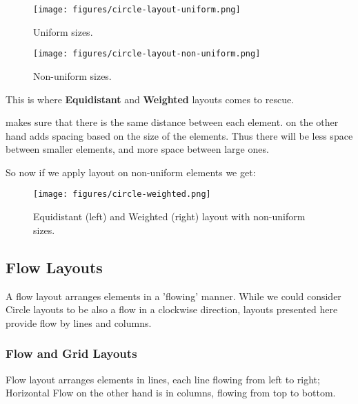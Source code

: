\documentclass[a4paper,10pt,twoside]{book}
\begin{document}
\begin{figure}

\begin{center}
\texttt{[image: figures/circle-layout-uniform.png]}\caption{Uniform sizes.\label{circle-layout-uniform}}\end{center}
\end{figure}



\begin{figure}

\begin{center}
\texttt{[image: figures/circle-layout-non-uniform.png]}\caption{Non-uniform sizes.\label{circle-layout-non-uniform}}\end{center}
\end{figure}


This is where \textbf{Equidistant} and \textbf{Weighted} layouts comes to rescue.

 makes sure that there is the same distance between each element.
 on the other hand adds spacing based on the size of the elements. Thus there will be less space between smaller elements, and more space between large ones.

So now if we apply layout on non-uniform elements we get:


\begin{figure}

\begin{center}
\texttt{[image: figures/circle-weighted.png]}\caption{Equidistant (left) and Weighted (right) layout with non-uniform sizes.\label{circle-weighted}}\end{center}
\end{figure}

\subsection{ Flow Layouts}
A flow layout arranges elements in a 'flowing' manner. While we could consider Circle layouts to be also a flow in a clockwise direction, layouts presented here provide flow by lines and columns.
\subsubsection{ Flow and Grid Layouts}
Flow layout arranges elements in lines, each line flowing from left to right; Horizontal Flow on the other hand is in columns, flowing from top to bottom.
\end{document}
